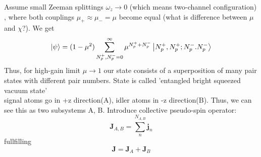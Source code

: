 Assume small Zeeman splittings $\omega_z \rightarrow 0$ (which means two-channel configuration) , where both couplings $\mu_+ \approx \mu_- = \mu$ become equal (what is difference between $\mu$ and $\chi$?). We get
\begin{equation}
	\ket{\psi} = (1-\mu^2) \sum_{N_p^+,N_p^- = 0}^\infty \mu^{N_p^+ + N_p^-} \ket{N_p^+,N_p^+;N_p^-.N_p^-}
\end{equation}
Thus, for high-gain limit $\mu \rightarrow 1$ our state consists of a superposition of many pair states with different pair numbers. State is called 'entangled bright squeezed vacuum state'
\\
signal atoms go in +z direction(A), idler atoms in -z direction(B). Thus, we can see this as two subsystems A, B. Introduce collective pseudo-spin operator: 
\begin{equation}
	\bm{J}_{A,B} = \sum_n^{N_{A,B}} \bm{j}_n 
\end{equation}
fullfilling
\begin{equation}
	\bm{J} = \bm{J}_A+ \bm{J}_B
\end{equation}

